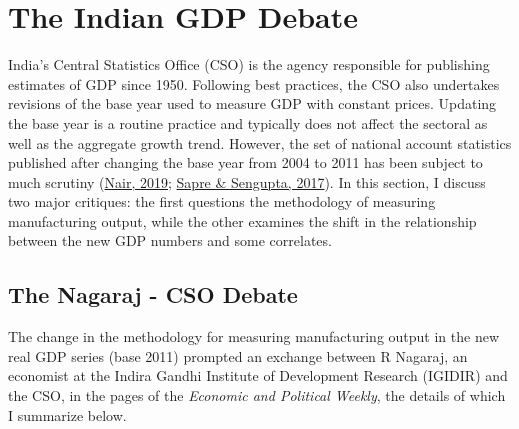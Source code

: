 \documentclass[12pt,nobind, a4paper]{reedthesis}
\begin{document}
 \hypertarget{deb}{%
 \section{The Indian GDP Debate}\label{deb}}

 India's Central Statistics Office (CSO) is the agency responsible for publishing estimates of GDP since 1950. Following best practices, the CSO also undertakes revisions of the base year used to measure GDP with constant prices. Updating the base year is a routine practice and typically does not affect the sectoral as well as the aggregate growth trend. However, the set of national account statistics published after changing the base year from 2004 to 2011 has been subject to much scrutiny (\protect\hyperlink{ref-nair_base_2019}{Nair, 2019}; \protect\hyperlink{ref-sapre_analysis_2017}{Sapre \& Sengupta, 2017}). In this section, I discuss two major critiques: the first questions the methodology of measuring manufacturing output, while the other examines the shift in the relationship between the new GDP numbers and some correlates.

 \hypertarget{the-nagaraj---cso-debate}{%
 \subsection{The Nagaraj - CSO Debate}\label{the-nagaraj---cso-debate}}

 The change in the methodology for measuring manufacturing output in the new real GDP series (base 2011) prompted an exchange between R Nagaraj, an economist at the Indira Gandhi Institute of Development Research (IGIDIR) and the CSO, in the pages of the \emph{Economic and Political Weekly}, the details of which I summarize below.
 \linebreak
\end{document}

